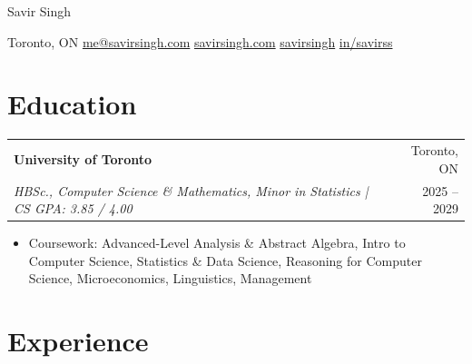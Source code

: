 \documentclass[11pt,letterpaper]{article}
\makeatletter
\newcommand{\resumeItem}[1]{
    \item \small{#1}
}
\newcommand{\entry}[4]{
\vspace{0.15em}
\begin{tabularx}{\textwidth}{@{}Xr@{}}
{\textbf{#1}} & {\small \textcolor{muted}{#2}} \\
{\small\textit{#3}} & {\small \textcolor{muted}{#4}}
\end{tabularx}
}
\makeatother
\begin{document}

\begin{center}

{\fontsize{18}{24}\selectfont \headingfont Savir Singh}

\vspace{0.25em}

{\small
\faHome \hspace{0.25em}
{Toronto, ON}
\hspace{1.2em}
\faEnvelope \hspace{0.25em}
\href{mailto:me@savirsingh.com}{me@savirsingh.com}
\hspace{1.2em}
\faGlobe \hspace{0.25em}
\href{https://savirsingh.com}{savirsingh.com}
\hspace{1.2em}
\faGithub \hspace{0.25em}
\href{https://github.com/savirsingh}{savirsingh}
\hspace{1.2em}
\faLinkedin \hspace{0.25em}
\href{https://linkedin.com/in/savirss}{in/savirss}
}

\vspace{-0.35em}

\end{center}


\section*{Education}

\entry
{University of Toronto}
{Toronto, ON}
{HBSc., Computer Science \& Mathematics, Minor in Statistics | CS GPA: 3.85 / 4.00}
{2025 -- 2029}

\vspace{-0.35em}

\begin{itemize}
    \resumeItem{Coursework: Advanced-Level Analysis \& Abstract Algebra, Intro to Computer Science, Statistics \& Data Science, Reasoning for Computer Science, Microeconomics, Linguistics, Management}
\end{itemize}


\section*{Experience}
\end{document}
